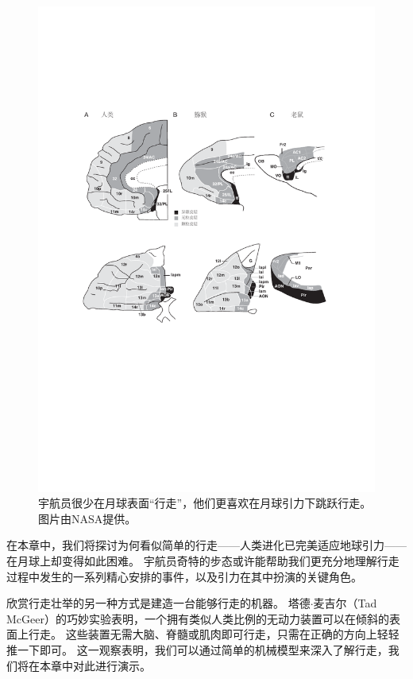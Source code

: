 \begin{figure}[!htb]
	\centering
	\includegraphics[width=1.0\linewidth]{chap2/2_1}
	\caption{宇航员很少在月球表面“行走”，他们更喜欢在月球引力下跳跃行走。
		图片由NASA提供。 \label{fig:2_1}}
\end{figure}


在本章中，我们将探讨为何看似简单的行走——人类进化已完美适应地球引力——在月球上却变得如此困难。
宇航员奇特的步态或许能帮助我们更充分地理解行走过程中发生的一系列精心安排的事件，以及引力在其中扮演的关键角色。


欣赏行走壮举的另一种方式是建造一台能够行走的机器。
塔德$\cdot$麦吉尔（Tad McGeer）的巧妙实验表明，一个拥有类似人类比例的无动力装置可以在倾斜的表面上行走。
这些装置无需大脑、脊髓或肌肉即可行走，只需在正确的方向上轻轻推一下即可。
这一观察表明，我们可以通过简单的机械模型来深入了解行走，我们将在本章中对此进行演示。


